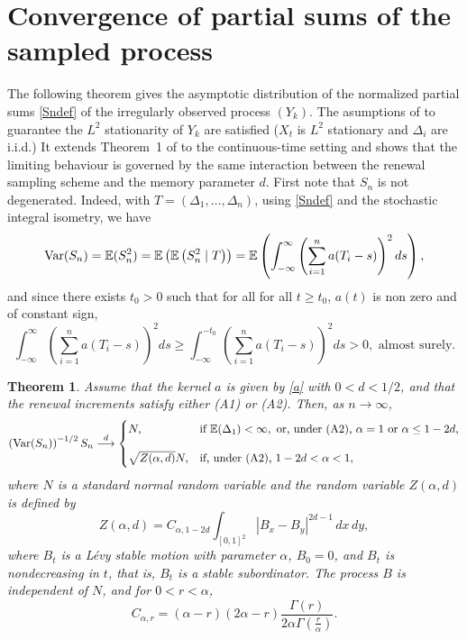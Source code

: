 \documentclass[preprint,12pt]{article}
\newtheorem{thm}{Theorem}
\newcommand{\Var}{{\rm Var}}
\begin{document}
\section{Convergence of partial sums of the sampled process}\label{sec:main}
The following theorem gives the asymptotic distribution of the normalized partial sums \eqref{Sndef} of the irregularly observed process $(Y_k)$. The asumptions of \cite{PhilippeRobetViano} to guarantee the $L^2$ stationarity of  $Y_k$ are satisfied ($X_t$ is $L^2$ stationary and $\Delta_i$ are i.i.d.)  It extends Theorem~1 of \cite{ouldhaye2024asymptoticsirregularlyobservedlong} to the continuous-time setting and shows that the limiting behaviour is governed by the same interaction between the renewal sampling scheme and the memory parameter $d$. First note that $S_n$ is not degenerated. Indeed, with $T=(\Delta_1,\ldots,\Delta_n)$, using \eqref{Sndef} and  the stochastic integral isometry, we have
\begin{equation}\label{conditional}
\Var(S_n)
=
\mathbb{E}(S_n^2)
=
\mathbb{E}\left(
\mathbb{E}\left(S_n^2\mid T\right)
\right)
=
\mathbb{E}\left(
\int_{-\infty}^{\infty}
\left(\sum_{i=1}^n a(T_i-s)\right)^2ds
\right),
\end{equation}
and since there exists $t_0>0$ such that for all for all $t\ge t_0$, $a(t)$ is non zero and of  constant sign,
$$
\int_{-\infty}^{\infty}
\left(\sum_{i=1}^n a(T_i-s)\right)^2ds\ge\int_{-\infty}^{-t_0}
\left(\sum_{i=1}^n a(T_i-s)\right)^2ds>0,\textrm{ almost surely}.
$$
\begin{thm}
Assume that the kernel $a$ is given by \eqref{a} with $0<d<1/2$, and that the renewal increments satisfy either {\rm(A1)} or {\rm(A2)}. Then, as $n\to\infty$,
$$
\left(\Var(S_n)\right)^{-1/2}S_n
\overset{d}{\longrightarrow}
\begin{cases}
N,
&
\textrm{if } \mathbb{E}(\Delta_1)<\infty,
\textrm{ or, under {\rm(A2)}, } \alpha=1
\textrm{ or } \alpha\le 1-2d,
\\[0.4cm]
\sqrt{Z(\alpha,d)}N,
&
\textrm{if, under {\rm(A2)}, } 1-2d<\alpha<1,
\end{cases}
$$
where $N$ is a standard normal random variable and the random variable $Z(\alpha,d)$ is defined by
$$
Z(\alpha,d)
=
C_{\alpha,1-2d}
\int_{[0,1]^2}|B_x-B_y|^{2d-1}\,dx\,dy,
$$
where $B_t$ is a L\'evy stable motion with parameter $\alpha$, $B_0=0$, and $B_t$ is nondecreasing in $t$, that is, $B_t$ is a stable subordinator. The process $B$ is independent of $N$, and for $0<r<\alpha$,
\begin{equation}\label{down1}
C_{\alpha,r}
=
(\alpha-r)(2\alpha-r)
\frac{\Gamma(r)}
{2\alpha\Gamma\left(\frac{r}{\alpha}\right)}.
\end{equation}
\end{thm}
\end{document}
